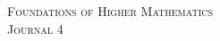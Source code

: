 \documentclass{article}
\begin{document}

\begin{center}
\textsc{\Large Foundations of Higher Mathematics}\\[.3cm]
\textsc{\Large Journal 4}\\[1cm]
\end{center}

\end{document}
